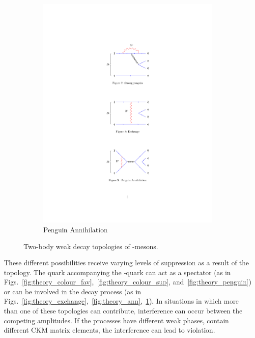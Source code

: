 \begin{figure}[!h]
\begin{subfigure}[b]{0.32\textwidth}
        \includegraphics[width=1.0\textwidth]{figs/Theory/PengAn.pdf}
        \caption{Penguin Annihilation}
        \label{fig:theory_peng_ann}
    \end{subfigure}
    \caption{Two-body weak decay topologies of \bquark-mesons.}
    \label{fig:Theory_topo}   
\end{figure}
These different possibilities receive varying levels of suppression as a result of the topology. The quark accompanying the \bquark-quark can act as a spectator (as in Figs.~\ref{fig:theory_colour_fav},~\ref{fig:theory_colour_sup}, and~\ref{fig:theory_penguin}) or can be involved in the decay process (as in Figs.~\ref{fig:theory_exchange},~\ref{fig:theory_ann},~\ref{fig:theory_peng_ann}).   
In situations in which more than one of these topologies can contribute, interference can occur between the competing amplitudes. If the processes have different weak phases, \ie contain different CKM matrix elements, the interference can lead to \CP violation.  


